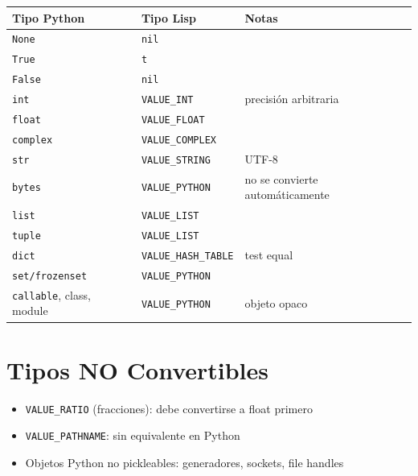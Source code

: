 \begin{center}
\begin{tabular}{lll}
\toprule
\textbf{Tipo Python} & \textbf{Tipo Lisp} & \textbf{Notas} \\
\midrule
\texttt{None} & \texttt{nil} & \\
\texttt{True} & \texttt{t} & \\
\texttt{False} & \texttt{nil} & \\
\texttt{int} & \texttt{VALUE\_INT} & precisión arbitraria \\
\texttt{float} & \texttt{VALUE\_FLOAT} & \\
\texttt{complex} & \texttt{VALUE\_COMPLEX} & \\
\texttt{str} & \texttt{VALUE\_STRING} & UTF-8 \\
\texttt{bytes} & \texttt{VALUE\_PYTHON} & no se convierte automáticamente \\
\texttt{list} & \texttt{VALUE\_LIST} & \\
\texttt{tuple} & \texttt{VALUE\_LIST} & \\
\texttt{dict} & \texttt{VALUE\_HASH\_TABLE} & test equal \\
\texttt{set/frozenset} & \texttt{VALUE\_PYTHON} & \\
\texttt{callable}, class, module & \texttt{VALUE\_PYTHON} & objeto opaco \\
\bottomrule
\end{tabular}
\end{center}

\section*{Tipos NO Convertibles}

\begin{itemize}
\item \texttt{VALUE\_RATIO} (fracciones): debe convertirse a float primero
\item \texttt{VALUE\_PATHNAME}: sin equivalente en Python
\item Objetos Python no pickleables: generadores, sockets, file handles
\end{itemize}

